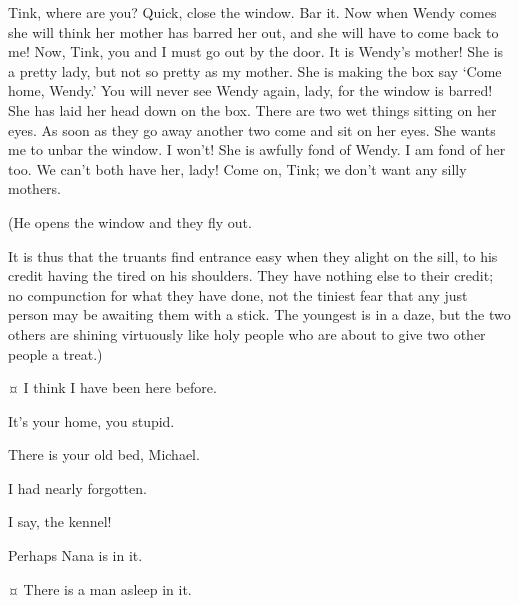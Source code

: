 \begin{drama}
\peterspeaks
Tink, where are you?
Quick, close the window.
Bar it.
Now when Wendy comes she will think her mother has barred her out, and she will have to come back to me!
Now, Tink, you and I must go out by the door.
It is Wendy’s mother!
She is a pretty lady, but not so pretty as my mother.
She is making the box say ‘Come home, Wendy.’
You will never see Wendy again, lady, for the window is barred!
She has laid her head down on the box.
There are two wet things sitting on her eyes.
As soon as they go away another two come and sit on her eyes.
She wants me to unbar the window.
I won’t!
She is awfully fond of Wendy.
I am fond of her too.
We can’t both have her, lady!
Come on, Tink; we don’t want any silly mothers.

\begin{stagedir}
(He opens the window and they fly out.

It is thus that the truants find entrance easy when they alight on the sill,
\john to his credit having the tired \michael on his shoulders.
They have nothing else to their credit;
no compunction for what they have done, not the tiniest fear that any just person may be awaiting them with a stick.
The youngest is in a daze,
but the two others are shining virtuously like holy people who are about to give two other people a treat.)
\end{stagedir}

\michaelspeaks {}¤
I think I have been here before.

\johnspeaks
It’s your home, you stupid.

\wendyspeaks
There is your old bed, Michael.

\michaelspeaks
I had nearly forgotten.

\johnspeaks
I say, the kennel!

\wendyspeaks
Perhaps Nana is in it.

\johnspeaks {}¤
There is a man asleep in it.


\end{drama}
